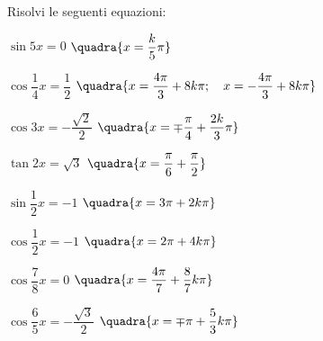 \begin{esercizio}\label{ese:03.1}
Risolvi le seguenti equazioni:
 \begin{enumeratea}
  \item $\sin 5x = 0$
   \hfill $\quadra{x = \dfrac{k}{5} \pi}$
  \item $\cos \dfrac{1}{4} x = \dfrac{1}{2}$
   \hfill $\quadra{x = \dfrac{4 \pi}{3} + 8k \pi; \quad
                   x = -\dfrac{4\pi}{3} + 8k \pi}$
  \item $\cos 3x = -\dfrac{\sqrt{2}}{2}$
   \hfill $\quadra{x = \mp \dfrac{\pi}{4} + \dfrac{2k}{3} \pi}$
  \item $\tan 2x = \sqrt{3}$
   \hfill $\quadra{x = \dfrac{\pi}{6} + \dfrac{\pi}{2}}$
  \item $\sin \dfrac{1}{2} x = -1$
   \hfill $\quadra{x = 3\pi + 2k \pi}$
  \item $\cos \dfrac{1}{2} x = -1$
   \hfill $\quadra{x = 2 \pi + 4k \pi}$
  \item $\cos \dfrac{7}{8}x = 0$
   \hfill $\quadra{x = \dfrac{4\pi}{7} + \dfrac{8}{7}k \pi}$
  \item $\cos \dfrac{6}{5}x = -\dfrac{\sqrt{3}}{2}$
   \hfill $\quadra{x = \mp \pi + \dfrac{5}{3} k \pi}$
 \end{enumeratea}
\end{esercizio}

